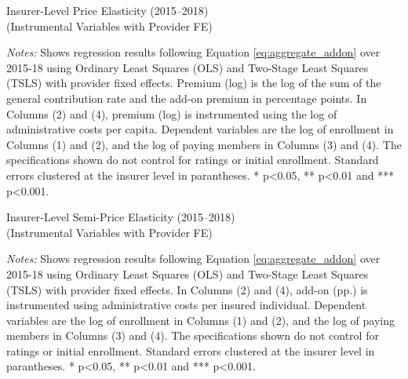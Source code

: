 \documentclass[a4paper, 11pt, english]{article}
\begin{document}
\begin{table}
	\caption{Insurer-Level Price Elasticity (2015--2018) \\ (Instrumental Variables with Provider FE)}
	\label{tab:IVaggregatesecondstage_premium_provider}
	
	\begin{minipage}{\textwidth}
		\vspace{3pt} 
		\footnotesize \textit{Notes:} Shows regression results following Equation \eqref{eq:aggregate_addon} over 2015-18 using Ordinary Least Squares (OLS) and Two-Stage Least Squares (TSLS) with provider fixed effects. 
		Premium (log) is the log of the sum of the general contribution rate and the add-on premium in percentage points. 
		In Columns (2) and (4), premium (log) is instrumented using the log of administrative costs per capita.
		Dependent variables are the log of enrollment in Columns (1) and (2), and the log of paying members in Columns (3) and (4). 
		The specifications shown do not control for ratings or initial enrollment.
		Standard errors clustered at the insurer level in parantheses. * p<0.05, **  p<0.01 and *** p<0.001. 
	\end{minipage}	
\end{table}

\begin{table}
	\captionsetup{justification=centering}
	\caption{Insurer-Level Semi-Price Elasticity (2015--2018) \\ (Instrumental Variables with Provider FE)}
	\label{tab:IVaggregatesecondstage_addon_provider}
	
	\begin{minipage}{\textwidth}
		\vspace{3pt} 
		\footnotesize \textit{Notes:} Shows regression results following Equation \eqref{eq:aggregate_addon} over 2015-18 using Ordinary Least Squares (OLS) and Two-Stage Least Squares (TSLS) with provider fixed effects.
		In Columns (2) and (4), add-on (pp.) is instrumented using administrative costs per insured individual. 
		Dependent variables are the log of enrollment in Columns (1) and (2), and the log of paying members in Columns (3) and (4).
		The specifications shown do not control for ratings or initial enrollment.
		Standard errors clustered at the insurer level in parantheses. * p<0.05, **  p<0.01 and *** p<0.001. 
	\end{minipage}	
\end{table}
\end{document}
